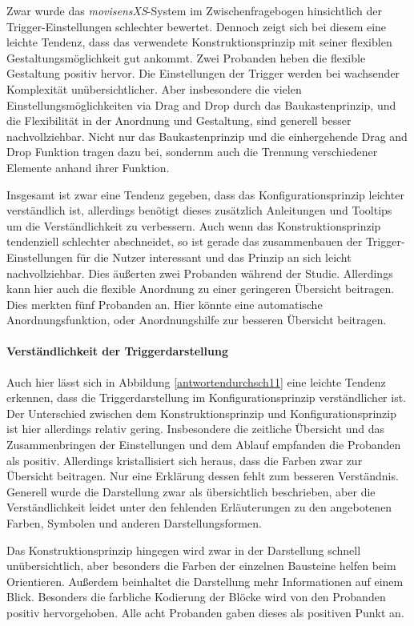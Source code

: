 Zwar wurde das \emph{movisensXS}-System im Zwischenfragebogen hinsichtlich der Trigger-Einstellungen schlechter bewertet. Dennoch zeigt sich bei diesem eine leichte Tendenz, dass das verwendete Konstruktionsprinzip mit seiner flexiblen Gestaltungsmöglichkeit gut ankommt. Zwei Probanden heben die flexible Gestaltung positiv hervor. Die Einstellungen der Trigger werden bei wachsender Komplexität unübersichtlicher. Aber insbesondere die vielen Einstellungsmöglichkeiten via Drag and Drop durch das Baukastenprinzip, und die Flexibilität in der Anordnung und Gestaltung, sind generell besser nachvollziehbar. Nicht nur das Baukastenprinzip und die einhergehende Drag and Drop Funktion tragen dazu bei, sondernm auch die Trennung verschiedener Elemente anhand ihrer Funktion. 

Insgesamt ist zwar eine Tendenz gegeben, dass das Konfigurationsprinzip leichter verständlich ist, allerdings benötigt dieses zusätzlich Anleitungen und Tooltips um die Verständlichkeit zu verbessern. Auch wenn das Konstruktionsprinzip tendenziell schlechter abschneidet, so ist gerade das zusammenbauen der Trigger-Einstellungen für die Nutzer interessant und das Prinzip an sich leicht nachvollziehbar. Dies äußerten zwei Probanden während der Studie. Allerdings kann hier auch die flexible Anordnung zu einer geringeren Übersicht beitragen. Dies merkten fünf Probanden an. Hier könnte eine automatische Anordnungsfunktion, oder Anordnungshilfe zur besseren Übersicht beitragen.


\paragraph{Verständlichkeit der Triggerdarstellung}
Auch hier lässt sich in Abbildung \ref{antwortendurchsch11} eine leichte Tendenz erkennen, dass die Triggerdarstellung im Konfigurationsprinzip verständlicher ist. Der Unterschied zwischen dem Konstruktionsprinzip und Konfigurationsprinzip ist hier allerdings relativ gering. Insbesondere die zeitliche Übersicht und das Zusammenbringen der Einstellungen und dem Ablauf empfanden die Probanden als positiv. Allerdings kristallisiert sich heraus, dass die Farben zwar zur Übersicht beitragen. Nur eine Erklärung dessen fehlt zum besseren Verständnis. Generell wurde die Darstellung zwar als übersichtlich beschrieben, aber die Verständlichkeit leidet unter den fehlenden Erläuterungen zu den angebotenen Farben, Symbolen und anderen Darstellungsformen. 

Das Konstruktionsprinzip hingegen wird zwar in der Darstellung schnell unübersichtlich, aber besonders die Farben der einzelnen Bausteine helfen beim Orientieren. Außerdem beinhaltet die Darstellung mehr Informationen auf einem Blick. Besonders die farbliche Kodierung der Blöcke wird von den Probanden positiv hervorgehoben. Alle acht Probanden gaben dieses als positiven Punkt an.

